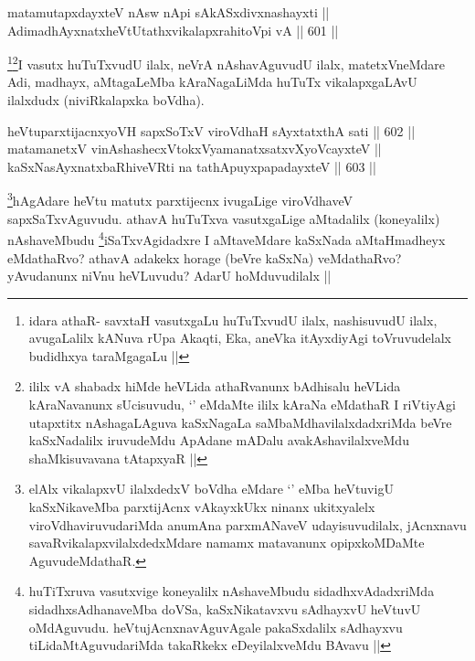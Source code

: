 
\begin{shl}
matamutapxdayxteV nAsw nApi sAkASxdivxnashayxti ||  \\
AdimadhAyxnatxheVtUtathxvikalapxrahitoV\s pi vA ||  601 ||  
\end{shl}

\begin{artha}
\footnote{idara athaR- savxtaH vasutxgaLu huTuTxvudU ilalx, nashisuvudU ilalx, avugaLalilx kANuva rUpa Akaqti, Eka, aneVka itAyxdiyAgi toVruvudelalx budidhxya taraMgagaLu ||}\footnote{ililx vA shabadx hiMde heVLida athaRvanunx bAdhisalu heVLida kAraNavanunx sUcisuvudu, `\stext' eMdaMte ililx kAraNa eMdathaR I riVtiyAgi utapxtitx nAshagaLAguva kaSxNagaLa saMbaMdhavilalxdadxriMda beVre kaSxNadalilx iruvudeMdu ApAdane mADalu avakAshavilalxveMdu shaMkisuvavana tAtapxyaR ||}I vasutx huTuTxvudU ilalx, neVrA nAshavAguvudU ilalx, matetxVneMdare Adi, madhayx, aMtagaLeMba kAraNagaLiMda huTuTx vikalapxgaLAvU ilalxdudx (niviRkalapxka boVdha).
\end{artha}


\begin{shl}
heVtuparxtijacnxyoVH sapxSoTxV viroVdhaH sAyxtatxthA sati ||  602 ||  \\
matamanetxV vinAshashecxVtokxV\s yamanatxsatxvXyoVcayxteV || \\
kaSxNasAyxnatxbaRhiveVRti na tathA\s puyxpapadayxteV ||  603 ||  
\end{shl}

\begin{artha}
\footnote{elAlx vikalapxvU ilalxdedxV boVdha eMdare `\stext' eMba heVtuvigU kaSxNikaveMba parxtijAcnx vAkayxkUkx ninanx ukitxyalelx viroVdhaviruvudariMda anumAna parxmANaveV udayisuvudilalx, jAcnxnavu savaRvikalapxvilalxdedxMdare namamx matavanunx opipxkoMDaMte AguvudeMdathaR.}hAgAdare heVtu matutx parxtijecnx ivugaLige viroVdhaveV sapxSaTxvAguvudu. athavA huTuTxva vasutxgaLige aMtadalilx (koneyalilx) nAshaveMbudu \footnote{huTiTxruva vasutxvige koneyalilx nAshaveMbudu sidadhxvAdadxriMda sidadhxsAdhanaveMba doVSa, kaSxNikatavxvu sAdhayxvU heVtuvU oMdAguvudu. heVtujAcnxnavAguvAgale pakaSxdalilx sAdhayxvu tiLidaMtAguvudariMda takaRkekx eDeyilalxveMdu BAvavu ||}iSaTxvAgidadxre I aMtaveMdare kaSxNada aMtaHmadheyx eMdathaRvo? athavA adakekx horage (beVre kaSxNa) veMdathaRvo? yAvudanunx niVnu heVLuvudu? AdarU hoMduvudilalx ||
\end{artha}

